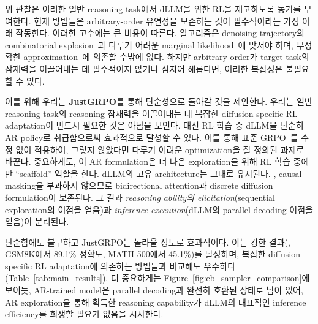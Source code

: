 위 관찰은 이러한 일반 reasoning task에서 dLLM을 위한 RL을 재고하도록 동기를 부여한다.
현재 방법들은 arbitrary-order 유연성을 보존하는 것이 필수적이라는 가정 아래 작동한다. 이러한 고수에는 큰 비용이 따른다. 알고리즘은 denoising trajectory의 combinatorial explosion~\cite{zhao2025d1,yang2025mmada,gong2025diffucoder}과 다루기 어려운 marginal likelihood~\cite{ou2025principled,wang2025spg}에 맞서야 하며, 부정확한 approximation~\cite{wang2025spg,ou2025principled,rojas2025improving}에 의존할 수밖에 없다.
하지만 arbitrary order가 target task의 잠재력을 이끌어내는 데 필수적이지 않거나 심지어 해롭다면, 이러한 복잡성은 불필요할 수 있다.

이를 위해 우리는 \textbf{JustGRPO}를 통해 단순성으로 돌아갈 것을 제안한다.
우리는 일반 reasoning task의 reasoning 잠재력을 이끌어내는 데 복잡한 diffusion-specific RL adaptation이 반드시 필요한 것은 아님을 보인다.
대신 RL 학습 중 dLLM을 단순히 AR policy로 취급함으로써 효과적으로 달성할 수 있다. 이를 통해 표준 GRPO~\cite{shao2024deepseekmath}를 수정 없이 적용하여, 그렇지 않았다면 다루기 어려운 optimization을 잘 정의된 과제로 바꾼다.
중요하게도, 이 AR formulation은 더 나은 exploration을 위해 RL 학습 중에만 ``scaffold'' 역할을 한다.
dLLM의 고유 architecture는 그대로 유지된다. \eg, causal masking을 부과하지 않으므로 bidirectional attention과 discrete diffusion formulation이 보존된다.
그 결과 \textit{reasoning ability의 elicitation}(sequential exploration의 이점을 얻음)과 \textit{inference execution}(dLLM의 parallel decoding 이점을 얻음)이 분리된다. 


단순함에도 불구하고 JustGRPO는 놀라울 정도로 효과적이다.
이는 강한 결과(\eg, GSM8K에서 89.1\% 정확도, MATH-500에서 45.1\%)를 달성하며, 복잡한 diffusion-specific RL adaptation에 의존하는 방법들과 비교해도 우수하다(Table~\ref{tab:main_results}).
더 중요하게는 Figure~\ref{fig:eb_sampler_comparison}에 보이듯, AR-trained model은 parallel decoding과 완전히 호환된 상태로 남아 있어, AR exploration을 통해 획득한 reasoning capability가 dLLM의 대표적인 inference efficiency를 희생할 필요가 없음을 시사한다.


